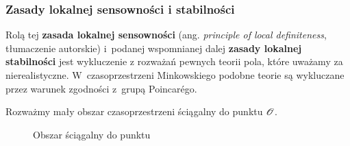 \documentclass[10pt,t]{beamer}
\begin{document}
\begin{frame}
  \frametitle{Zasady lokalnej sensowności i stabilności}


  Rolą tej \textbf{zasada lokalnej sensowności} (ang. \textit{principle
    of local definiteness}, tłumaczenie autorskie) i~podanej
  wspomnianej dalej \textbf{zasady lokalnej stabilności} jest
  wykluczenie z rozważań pewnych teorii pola, które uważamy za
  nierealistyczne. W~czasoprzestrzeni Minkowskiego podobne teorie są
  wykluczane przez warunek zgodności z~grupą Poincar\'{e}go.

  Rozważmy mały obszar czasoprzestrzeni ściągalny do punktu
  $\mathcal{O}$.





  \begin{figure}[h]


    \caption{Obszar ściągalny do punktu}

  \end{figure}

\end{frame}
\end{document}
